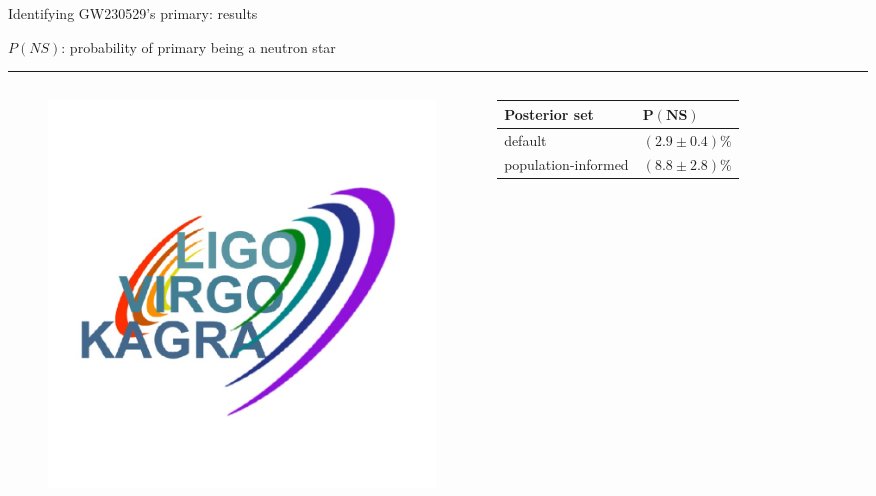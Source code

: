\documentclass[usenames,dvipsnames,t]{beamer}
\begin{document}
\begin{frame}{Identifying GW230529's primary: results}

  \def\heightlvk{2.25cm}
  \def\heightnmma{4.5cm}

  \def\x{2mm}
  \def\mycolwidth{4cm}
  \def\mycolwidthh{2cm}

  $P(NS)$: probability of primary being a neutron star

  \vspace{\x}

  \hrule

  \begin{minipage}[t][\heightlvk]{\textwidth}
    \begin{columns}

      \begin{figure}[t]
        \centering
        \includegraphics[width=\linewidth]{Figures/LVK Logo.jpeg}
      \end{figure}
  

      \begin{table}
        \centering
        \begin{tabular}{| p{\mycolwidth} | p{\mycolwidthh} |}
          \hline
          \textbf{Posterior set} & $\mathbf{P(NS)}$ \\
          \hline
          default & $(2.9 \pm 0.4)\%$ \\
          population-informed & $(8.8 \pm 2.8)\%$ \\
          \hline
        \end{tabular}
      \end{table}


\end{columns}
\end{minipage}
\end{frame}
\end{document}

